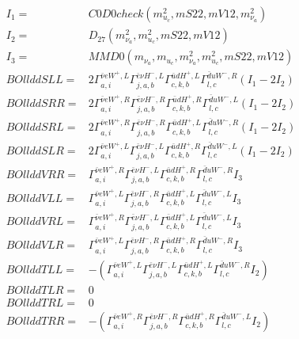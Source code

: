 \documentclass[A4,landscape]{article}
\begin{document}
\begin{align} 
I_1 = & C0D0check(m^2_{u_{{c}}}, mS22, mV12, m^2_{\nu_{{a}}}) \\ 
I_2 = & D_{27}(m^2_{\nu_{{a}}}, m^2_{u_{{c}}}, mS22, mV12) \\ 
I_3 = & MMD0(m_{\nu_{{a}}}, m_{u_{{c}}}, m^2_{\nu_{{a}}}, m^2_{u_{{c}}}, mS22, mV12) \\ 
  BOllddSLL= & 2  \Gamma^{\bar{\nu}e W^+,L}_{a, i} \Gamma^{\bar{e}\nu H^- ,L}_{j, a, b} \Gamma^{\bar{u}d H^+,L}_{c, k, b} \Gamma^{\bar{d}u W^- ,R}_{l, c} (I_1 - 2 I_2) \\ 
  BOllddSRR= & 2  \Gamma^{\bar{\nu}e W^+,R}_{a, i} \Gamma^{\bar{e}\nu H^- ,R}_{j, a, b} \Gamma^{\bar{u}d H^+,R}_{c, k, b} \Gamma^{\bar{d}u W^- ,L}_{l, c} (I_1 - 2 I_2) \\ 
  BOllddSRL= & 2  \Gamma^{\bar{\nu}e W^+,R}_{a, i} \Gamma^{\bar{e}\nu H^- ,R}_{j, a, b} \Gamma^{\bar{u}d H^+,L}_{c, k, b} \Gamma^{\bar{d}u W^- ,R}_{l, c} (I_1 - 2 I_2) \\ 
  BOllddSLR= & 2  \Gamma^{\bar{\nu}e W^+,L}_{a, i} \Gamma^{\bar{e}\nu H^- ,L}_{j, a, b} \Gamma^{\bar{u}d H^+,R}_{c, k, b} \Gamma^{\bar{d}u W^- ,L}_{l, c} (I_1 - 2 I_2) \\ 
  BOllddVRR= &  \Gamma^{\bar{\nu}e W^+,R}_{a, i} \Gamma^{\bar{e}\nu H^- ,L}_{j, a, b} \Gamma^{\bar{u}d H^+,R}_{c, k, b} \Gamma^{\bar{d}u W^- ,R}_{l, c} I_3 \\ 
  BOllddVLL= &  \Gamma^{\bar{\nu}e W^+,L}_{a, i} \Gamma^{\bar{e}\nu H^- ,R}_{j, a, b} \Gamma^{\bar{u}d H^+,L}_{c, k, b} \Gamma^{\bar{d}u W^- ,L}_{l, c} I_3 \\ 
  BOllddVRL= &  \Gamma^{\bar{\nu}e W^+,R}_{a, i} \Gamma^{\bar{e}\nu H^- ,L}_{j, a, b} \Gamma^{\bar{u}d H^+,L}_{c, k, b} \Gamma^{\bar{d}u W^- ,L}_{l, c} I_3 \\ 
  BOllddVLR= &  \Gamma^{\bar{\nu}e W^+,L}_{a, i} \Gamma^{\bar{e}\nu H^- ,R}_{j, a, b} \Gamma^{\bar{u}d H^+,R}_{c, k, b} \Gamma^{\bar{d}u W^- ,R}_{l, c} I_3 \\ 
  BOllddTLL= & -( \Gamma^{\bar{\nu}e W^+,L}_{a, i} \Gamma^{\bar{e}\nu H^- ,L}_{j, a, b} \Gamma^{\bar{u}d H^+,L}_{c, k, b} \Gamma^{\bar{d}u W^- ,R}_{l, c} I_2) \\ 
  BOllddTLR= & 0 \\ 
  BOllddTRL= & 0 \\ 
  BOllddTRR= & -( \Gamma^{\bar{\nu}e W^+,R}_{a, i} \Gamma^{\bar{e}\nu H^- ,R}_{j, a, b} \Gamma^{\bar{u}d H^+,R}_{c, k, b} \Gamma^{\bar{d}u W^- ,L}_{l, c} I_2) \\ 
\end{align} 
\end{document}
